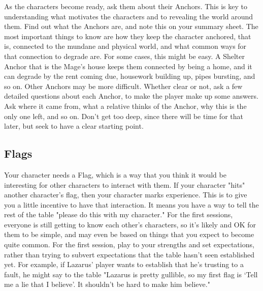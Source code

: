 \documentclass[
  oneside,
  statementpaper,
  9pt]{memoir}
\begin{document}
\begin{MC}

As the characters become ready, ask them about their Anchors. This is key to understanding what motivates the characters and to revealing the world around them. Find out what the Anchors are, and note this on your summary sheet. The most important things to know are how they keep the character anchored, that is, connected to the mundane and physical world, and what common ways for that connection to degrade are. For some cases, this might be easy. A Shelter Anchor that is the Mage’s house keeps them connected by being a home, and it can degrade by the rent coming due, housework building up, pipes bursting, and so on. Other Anchors may be more difficult. Whether clear or not, ask a few detailed questions about each Anchor, to make the player make up some answers. Ask where it came from, what a relative thinks of the Anchor, why this is the only one left, and so on. Don’t get too deep, since there will be time for that later, but seek to have a clear starting point.

\end{MC}

\hypertarget{flags}{%
\subsection{Flags}\label{flags}}

\begin{Player}

Your character needs a Flag, which is a way that you think it would be interesting for other characters to interact with them. If your character "hits" another character's flag, then your character marks experience. This is to give you a little incentive to have that interaction. It means you have a way to tell the rest of the table "please do this with my character." For the first sessions, everyone is still getting to know each other's characters, so it's likely and OK for them to be simple, and may even be based on things that you expect to become quite common. For the first session, play to your strengths and set expectations, rather than trying to subvert expectations that the table hasn’t seen established yet. For example, if Lazarus’ player wants to establish that he’s trusting to a fault, he might say to the table "Lazarus is pretty gullible, so my first flag is ‘Tell me a lie that I believe’. It shouldn’t be hard to make him believe."

\end{Player}
\end{document}
